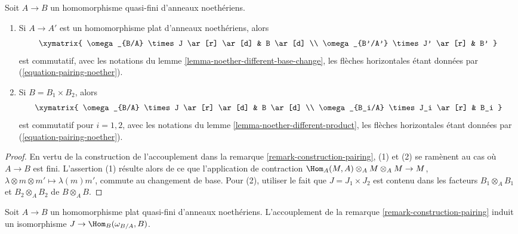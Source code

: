 \begin{lemma}
\label{lemma-noether-pairing-compatibilities}
Soit $A \to B$ un homomorphisme quasi-fini d'anneaux noethériens.
\begin{enumerate}
\item Si $A \to A'$ est un homomorphisme plat d'anneaux noethériens, alors
$$
\xymatrix{
\omega_{B/A} \times J \ar[r] \ar[d] & B \ar[d]  \\
\omega_{B'/A'} \times J' \ar[r] & B'
}
$$
est commutatif, avec les notations du
lemme \ref{lemma-noether-different-base-change},
les flèches horizontales étant données par
(\ref{equation-pairing-noether}).
\item Si $B = B_1 \times B_2$, alors
$$
\xymatrix{
\omega_{B/A} \times J \ar[r] \ar[d] & B \ar[d]  \\
\omega_{B_i/A} \times J_i \ar[r] & B_i
}
$$
est commutatif pour $i = 1, 2$, avec les notations du
lemme \ref{lemma-noether-different-product},
les flèches horizontales étant données par
(\ref{equation-pairing-noether}).
\end{enumerate}
\end{lemma}

\begin{proof}
En vertu de la construction de l'accouplement dans la
remarque \ref{remark-construction-pairing},
(1) et (2) se ramènent au cas où $A \to B$ est fini.
L'assertion (1) résulte alors de ce que l'application de contraction
$\Hom_A(M, A) \otimes_A M \otimes_A M \to M$,
$\lambda \otimes m \otimes m' \mapsto \lambda(m)m'$,
commute au changement de base. Pour (2), utiliser le fait que
$J = J_1 \times J_2$ est contenu dans les facteurs
$B_1 \otimes_A B_1$ et $B_2 \otimes_A B_2$
de $B \otimes_A B$.
\end{proof}

\begin{lemma}
\label{lemma-noether-pairing-flat-quasi-finite}
Soit $A \to B$ un homomorphisme plat quasi-fini d'anneaux noethériens.
L'accouplement de la remarque \ref{remark-construction-pairing} induit un isomorphisme
$J \to \Hom_B(\omega_{B/A}, B)$.
\end{lemma}

